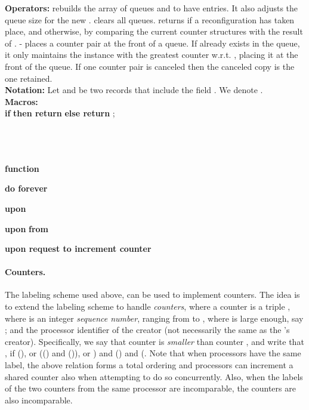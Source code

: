 \documentclass[11pt]{article}
\begin{document}
\begin{algorithm}
\begin{footnotesize}
{\bf Operators:} 
 rebuilds the  array of queues and  to have  entries. It also adjusts the queue size for the new .
 clears all  queues.
 returns  if a reconfiguration has taken place, and  otherwise, by comparing the current counter structures with the result of .
 - places a counter pair  at the front of a queue. 
If  already exists in the queue, it only maintains the instance with the greatest counter w.r.t. , placing it at the front of the queue. 
If one counter pair is canceled then the canceled copy is the one retained. \label{CCT:operations}\\ 
{\bf Notation:} Let  and  be two records that include the field . We denote        .\\



{\bf Macros:}\\  {\bf if}    {\bf then return}  {\bf else return }; \\
    ~~~\\
	\\	
 {}\\  
	 	\lForEach{}{}  
	 \label{CCT:cancExh}




{\bf function}  \lForEach{}{} 




{\bf do forever} \Begin{

\If{}{
\; \; \;\;\; }
}

{\bf upon}  


{\bf upon}  {\bf from}  \Begin{  \If{}{
\; \;\; } 
}

\textbf{upon request to increment counter } 

\end{footnotesize}
\end{algorithm}








\paragraph{Counters.}
The labeling scheme used above, can be used to implement counters.  
The idea is to extend the labeling scheme to handle {\em counters}, where a counter is a triple , where  is an integer {\em sequence number}, ranging from  to , where  is large enough, say ; and  the processor identifier of the  creator (not necessarily the same as the 's creator). 
Specifically, we say that counter  is {\em smaller} than counter , and write that , if (), or (() and ()), or ) and () and (. 
Note that when processors have the same label, the above relation forms a total ordering and processors can increment a shared counter also when attempting to do so concurrently. 
Also, when the labels of the two counters from the same processor are incomparable, the counters are also incomparable.
\end{document}
